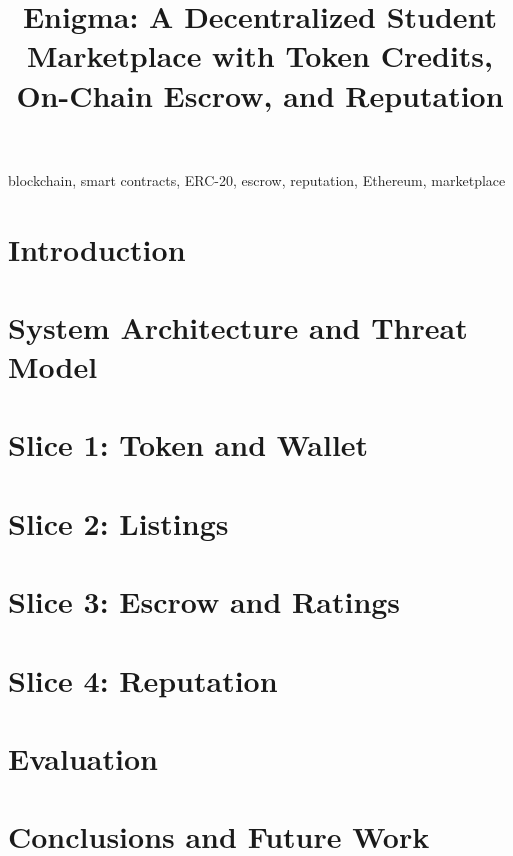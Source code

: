\documentclass[conference]{IEEEtran}
\begin{document}
\title{Enigma: A Decentralized Student Marketplace with Token Credits, On-Chain Escrow, and Reputation}

\author{
}

\maketitle

\begin{abstract}

\end{abstract}

\begin{IEEEkeywords}
blockchain, smart contracts, ERC-20, escrow, reputation, Ethereum, marketplace
\end{IEEEkeywords}

\section{Introduction}
\label{sec:intro}


\section{System Architecture and Threat Model}
\label{sec:arch}


\section{Slice 1: Token and Wallet}
\label{sec:slice1}


\section{Slice 2: Listings}
\label{sec:slice2}


\section{Slice 3: Escrow and Ratings}
\label{sec:slice3}


\section{Slice 4: Reputation}
\label{sec:slice4}


\section{Evaluation}
\label{sec:eval}


\section{Conclusions and Future Work}
\label{sec:concl}



\end{document}
